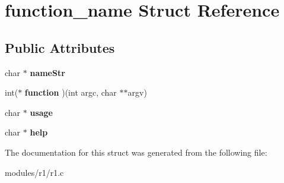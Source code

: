 \hypertarget{structfunction__name}{}\section{function\+\_\+name Struct Reference}
\label{structfunction__name}
\subsection*{Public Attributes}
\begin{DoxyCompactItemize}
\item 
char $\ast$ {\bfseries name\+Str}\hypertarget{structfunction__name_a7a94f7f31542a15b63160b6b213e0bcb}{}\label{structfunction__name_a7a94f7f31542a15b63160b6b213e0bcb}

\item 
int($\ast$ {\bfseries function} )(int argc, char $\ast$$\ast$argv)\hypertarget{structfunction__name_ad80214b3eea6c438c13ff5461c5350ab}{}\label{structfunction__name_ad80214b3eea6c438c13ff5461c5350ab}

\item 
char $\ast$ {\bfseries usage}\hypertarget{structfunction__name_a30f593e52febda0cc9d9703b9015fb0f}{}\label{structfunction__name_a30f593e52febda0cc9d9703b9015fb0f}

\item 
char $\ast$ {\bfseries help}\hypertarget{structfunction__name_ac0f73e570d7d03a9f378a70e6d4d5632}{}\label{structfunction__name_ac0f73e570d7d03a9f378a70e6d4d5632}

\end{DoxyCompactItemize}


The documentation for this struct was generated from the following file\+:\begin{DoxyCompactItemize}
\item 
modules/r1/r1.\+c\end{DoxyCompactItemize}
